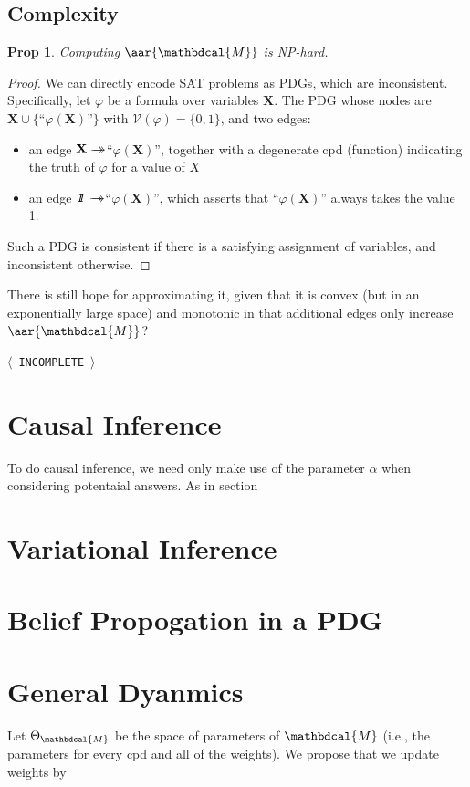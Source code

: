 \documentclass{article}
\theoremstyle{plain}
\newtheorem{prop}[theorem]{Prop}
\theoremstyle{definition}
\theoremstyle{remark}
\newcommand\mat[1]{\mathbf{#1}}
\newcommand{\tto}{\rightarrow\mathrel{\mspace{-15mu}}\rightarrow}
\newcommand{\V}{\mathcal V}
\newcommand{\dg}[1]{\mathbdcal{#1}}
\newcommand{\pdgunit}{\mathrlap{\mathit 1} \mspace{2.3mu}\mathit 1}
\newcommand{\TODO}[1][INCOMPLETE]{{\centering\Large\color{red}$\langle$~\texttt{#1}~$\rangle$\par}}
\begin{document}
\subsection{Complexity}

\begin{prop}
	Computing $\aar{\dg M}$ is NP-hard.  
\end{prop}
\begin{proof}
	We can directly encode SAT problems as PDGs, which are inconsistent.
	Specifically, let $\varphi$ be a formula over variables $\mat X$. The PDG
	whose nodes are $\mat X \cup \{$``$\varphi(\mat X)$''$\}$ with $\V(\varphi) = \{0,1\}$, and
	two edges:
	\begin{itemize}	
		\item an edge $\mat X \tto$``$\varphi(\mat X)$'', together with a degenerate cpd
			(function) indicating the truth of
			$\varphi$ for a value of $X$
		\item an edge $\pdgunit \tto $``$\varphi(\mat X)$'', which asserts that 
			``$\varphi(\mat X)$'' always takes the value 1.
	\end{itemize}
	Such a PDG is consistent if there is a satisfying assignment of variables, and 
	inconsistent otherwise.
\end{proof}

There is still hope for approximating it, given that it is convex (but in an exponentially
large space) and monotonic in that additional edges only increase $\aar{\dg M}$? 

\TODO

\section{Causal Inference}
To do causal inference, we need only make use of the parameter $\alpha$ when considering
potentaial answers. As in section 

\section{Variational Inference}

\section{Belief Propogation in a PDG}

\section{General Dyanmics}
Let $\Theta_\dg M$ be the space of parameters of $\dg M$ (i.e., the parameters for
every cpd and all of the weights). We propose that we update weights by
\end{document}
